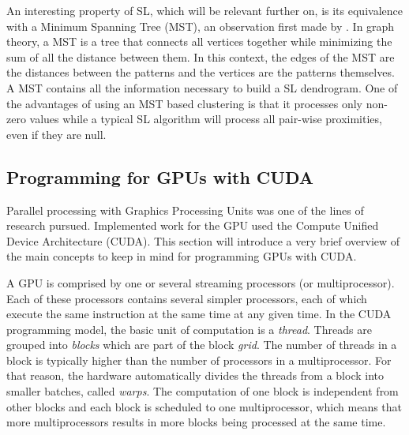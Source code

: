 An interesting property of SL, which will be relevant further on, is its equivalence with a Minimum Spanning Tree (MST), an observation first made by \cite{Gower1969}.
In graph theory, a MST is a tree that connects all vertices together while minimizing the sum of all the distance between them.
In this context, the edges of the MST are the distances between the patterns and the vertices are the patterns themselves.
A MST contains all the information necessary to build a SL dendrogram.
One of the advantages of using an MST based clustering is that it processes only non-zero values while a typical SL algorithm will process all pair-wise proximities, even if they are null.

\subsection{Programming for GPUs with CUDA}

Parallel processing with Graphics Processing Units was one of the lines of research pursued.
Implemented work for the GPU used the Compute Unified Device Architecture (CUDA).
This section will introduce a very brief overview of the main concepts to keep in mind for programming GPUs with CUDA.

A GPU is comprised by one or several streaming processors (or multiprocessor).
Each of these processors contains several simpler processors, each of which execute the same instruction at the same time at any given time.
In the CUDA programming model, the basic unit of computation is a \emph{thread}.
Threads are grouped into \emph{blocks} which are part of the block \emph{grid}.
The number of threads in a block is typically higher than the number of processors in a multiprocessor.
For that reason, the hardware automatically divides the threads from a block into smaller batches, called \emph{warps}.
The computation of one block is independent from other blocks and each block is scheduled to one multiprocessor, which means that more multiprocessors results in more blocks being processed at the same time.


